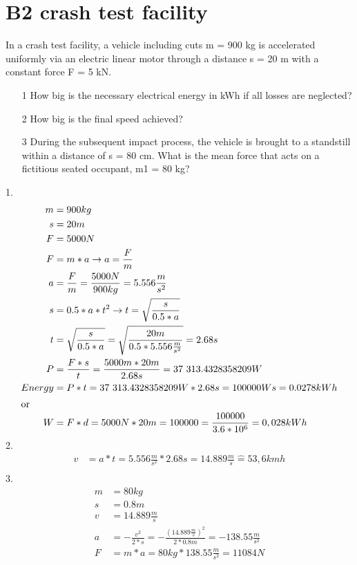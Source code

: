 \documentclass[10pt,ngerman]{scrartcl}
\begin{document}
\section{B2 crash test facility}
In a crash test facility, a vehicle including cuts m = 900 kg is accelerated uniformly via an electric linear motor through a distance s = 20 m with a constant force F = 5 kN.
\begin{enumerate}
	\item[1] How big is the necessary electrical energy in kWh if all losses are neglected?
	\item[2] How big is the final speed achieved?
	\item[3] During the subsequent impact process, the vehicle is brought to a standstill within a distance of s = 80 cm. What is the mean force that acts on a fictitious seated occupant, m1 = 80 kg?
\end{enumerate}
1. 
	\begin{align*}
			m &= 900 kg \\
			s &= 20 m \\
			F &= 5000N \\
			F &= m * a \rightarrow a = \frac{F}{m} \\
			a &= \frac{F}{m} = \frac{5000N}{900kg} = 5.556 \frac{m}{s^{2}} \\
			s &= 0.5 * a * t^{2} \rightarrow t = \sqrt{\frac{s}{0.5 * a}} \\
			t &= \sqrt{\frac{s}{0.5*a}} = \sqrt{\frac{20m}{0.5 * 5.556 \frac{m}{s^{2}}}} = 2.68s \\
			P &= \frac{F * s}{t} = \frac{5000m * 20 m}{2.68s} = 37 313.4328358209 W \\
			Energy &= P * t = 37 313.4328358209 W * 2.68s = 100000Ws = 0.0278kWh \\
			\intertext{or}
			W &= F * d = 5000N * 20m = 100000 = \frac{100000}{3.6 * 10^6} = 0,028 kWh
	\end{align*}
2.
	\begin{align*}
		v &= a * t = 5.556 \frac{m}{s^{2}} * 2.68s = 14.889 \frac{m}{s} \widehat{=} 53,6 kmh \\		
	\end{align*}
3.
	\begin{align*}
		m &= 80 kg \\
		s &= 0.8 m \\
		v &= 14.889 \frac{m}{s} \\
		a &= - \frac{v^{2}}{2*s} = - \frac{(14.889 \frac{m}{s})^{2}}{2*0.8m} = -138.55 \frac{m}{s^{2}} \\
		F &= m * a = 80 kg * 138.55 \frac{m}{s^{2}} = 11084 N
	\end{align*}
\end{document}
